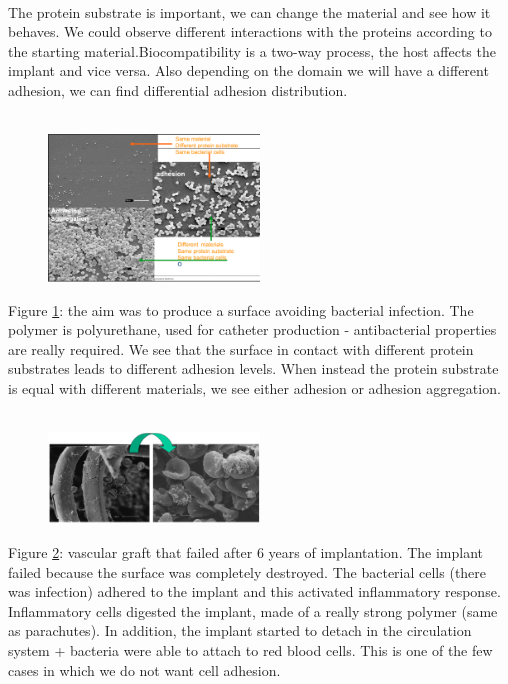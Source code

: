 \\
\noindent
The protein substrate is important, we can change the material and see how it behaves.
We could observe different interactions with the proteins according to the starting material.Biocompatibility is a two-way process, the host affects the implant and vice versa. Also depending on the domain we will have a different adhesion, we can find differential adhesion distribution.
\\
\\
\noindent
\begin{figure}[h]
\centering
\includegraphics[width=0.5\textwidth]{polyu}
\caption{\label{fig:polyu}}
\end{figure}
\noindent
Figure \ref{fig:polyu}: the aim was to produce a surface avoiding bacterial infection. The polymer is polyurethane, used for catheter production - antibacterial properties are really required.
We see that the surface in contact with different protein substrates leads to different adhesion levels. When instead the protein substrate is equal with different materials, we see either adhesion or adhesion aggregation.
\\
\\
\noindent
\begin{figure}[h]
\includegraphics[width=0.5\textwidth]{vascular}
\centering
\caption{\label{fig:vascular}}
\end{figure}
\noindent
Figure \ref{fig:vascular}: vascular graft that failed after 6 years of implantation. The implant failed because the surface was completely destroyed. The bacterial cells (there was infection) adhered to the implant and this activated inflammatory response. Inflammatory cells digested the implant, made of a really strong polymer (same as parachutes). In addition, the implant started to detach in the circulation system + bacteria were able to attach to red blood cells. This is one of the few cases in which we do not want cell adhesion.

